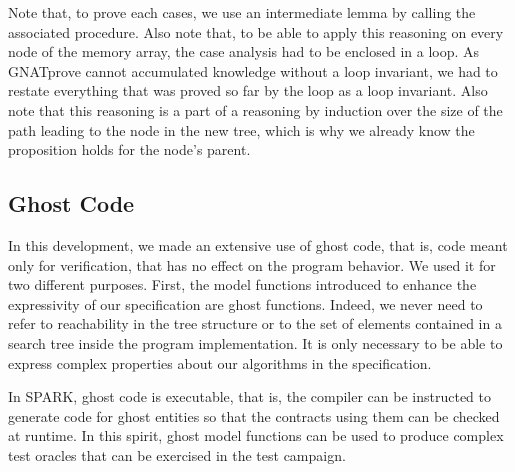 \documentclass[11pt,a4paper]{article}
\newcommand{\gnatprove}{GNATprove\xspace}
\begin{document}
Note that, to prove each cases, we use an intermediate lemma by calling the associated procedure.
Also note that, to be able to apply this reasoning on every node of the memory array, the case
analysis had to be enclosed in a loop. As \gnatprove cannot accumulated knowledge without a loop
invariant, we had to restate everything that was proved so far by the loop as a loop invariant.
Also note that this reasoning is a part of a reasoning by induction over the size of the path
leading to the node in the new tree, which is why we already know the proposition holds for the
node's parent.

\subsection{Ghost Code}



In this development, we made an extensive use of ghost code, that is, code meant only for verification,
that has no effect on the program behavior. We used it for two different purposes. First, the model
functions introduced to enhance the expressivity of our specification are ghost functions. Indeed, we
never need to refer to reachability in the tree structure or to the set of elements contained in a
search tree inside the program implementation. It is only necessary to be able to express complex
properties about our algorithms in the specification.

In SPARK, ghost code is executable, that is, the compiler can be instructed to generate code for ghost
entities so that the contracts using them can be checked at runtime. In this spirit, ghost model functions
can be used to produce complex test oracles that can be exercised in the test campaign.
\end{document}
